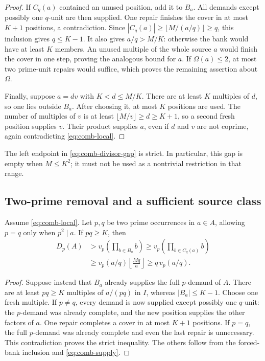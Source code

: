 \begin{proof}
If $C_q(a)$ contained an unused position, add it to $B_a$. All
demands except possibly one $q$-unit are then supplied. One repair
finishes the cover in at most $K+1$ positions, a contradiction.
Since
$|C_q(a)|\ge\lfloor M/(a/q)\rfloor\ge q$, this inclusion gives
$q\le K-1$. It also gives $a/q>M/K$: otherwise the bank would have
at least $K$ members. An unused multiple of the whole source $a$
would finish the cover in one step, proving the analogous bound for
$a$. If $\Omega(a)\le2$, at most two prime-unit repairs would suffice,
which proves the remaining assertion about $\Omega$.

Finally, suppose $a=dv$ with $K<d\le M/K$. There are at least $K$
multiples of $d$, so one lies outside $B_a$. After choosing it, at
most $K$ positions are used. The number of multiples of $v$ is at
least $\lfloor M/v\rfloor\ge d\ge K+1$, so a second fresh position
supplies $v$. Their product supplies $a$, even if $d$ and $v$ are
not coprime, again contradicting \eqref{eq:comb-local}.
\end{proof}

The left endpoint in \eqref{eq:comb-divisor-gap} is strict. In
particular, this gap is empty when $M\le K^2$; it must not be used
as a nontrivial restriction in that range.

\subsection{Two-prime removal and a sufficient source class}

\begin{lemma}
\label{lem:comb-pair}
Assume \eqref{eq:comb-local}. Let $p,q$ be two prime occurrences in
$a\in A$, allowing $p=q$ only when $p^2\mid a$. If $pq\ge K$, then
\begin{equation}
 \begin{split}
 D_p(A)&>v_p\!\left(\prod_{b\in B_a}b\right)
 \ge v_p\!\left(\prod_{b\in C_q(a)}b\right)\\
 &\ge v_p(a/q)\left\lfloor\frac{Mq}{a}\right\rfloor
 \ge q\,v_p(a/q).
 \end{split}
 \label{eq:comb-pair-demand}
\end{equation}
\end{lemma}

\begin{proof}
Suppose instead that $B_a$ already supplies the full $p$-demand of
$A$. There are at least $pq\ge K$ multiples of $a/(pq)$ in $I$,
whereas $|B_a|\le K-1$. Choose one fresh multiple. If $p\ne q$,
every demand is now supplied except possibly one $q$-unit: the
$p$-demand was already complete, and the new position supplies the
other factors of $a$. One repair completes a cover in at most
$K+1$ positions. If $p=q$, the full $p$-demand was already complete
and even the last repair is unnecessary. This contradiction proves
the strict inequality. The others follow from the forced-bank
inclusion and \eqref{eq:comb-supply}.
\end{proof}

